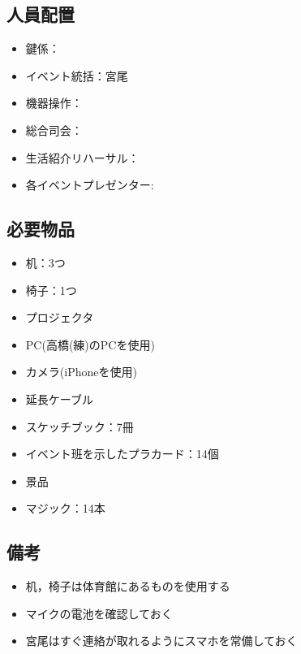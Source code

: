 \subsection{人員配置}
\begin{itemize}
\item 鍵係：
\item イベント統括：宮尾
\item 機器操作：
\item 総合司会：
\item 生活紹介リハーサル：
\item 各イベントプレゼンター:
\end{itemize}




\subsection{必要物品}
\begin{itemize}
\item 机：3つ
\item 椅子：1つ
\item プロジェクタ
\item PC(高橋(練)のPCを使用)
\item カメラ(iPhoneを使用)
\item 延長ケーブル
\item スケッチブック：7冊
\item イベント班を示したプラカード：14個
\item 景品
\item マジック：14本
\end{itemize}


\subsection{備考}
\begin{itemize}
\item 机，椅子は体育館にあるものを使用する
\item マイクの電池を確認しておく
\item 宮尾はすぐ連絡が取れるようにスマホを常備しておく
\end{itemize}

%

